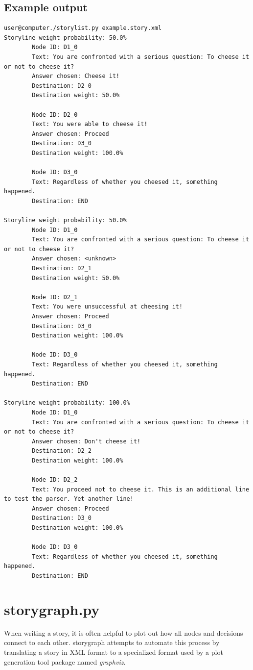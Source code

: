 \documentclass[12pt,letterpaper]{article}
\begin{document}
 \subsection{Example output}
 \begin{lstlisting}[breaklines=true]
user@computer./storylist.py example.story.xml
Storyline weight probability: 50.0%
        Node ID: D1_0
        Text: You are confronted with a serious question: To cheese it or not to cheese it?
        Answer chosen: Cheese it!
        Destination: D2_0
        Destination weight: 50.0%

        Node ID: D2_0
        Text: You were able to cheese it!
        Answer chosen: Proceed
        Destination: D3_0
        Destination weight: 100.0%

        Node ID: D3_0
        Text: Regardless of whether you cheesed it, something happened.
        Destination: END

Storyline weight probability: 50.0%
        Node ID: D1_0
        Text: You are confronted with a serious question: To cheese it or not to cheese it?
        Answer chosen: <unknown>
        Destination: D2_1
        Destination weight: 50.0%

        Node ID: D2_1
        Text: You were unsuccessful at cheesing it!
        Answer chosen: Proceed
        Destination: D3_0
        Destination weight: 100.0%

        Node ID: D3_0
        Text: Regardless of whether you cheesed it, something happened.
        Destination: END

Storyline weight probability: 100.0%
        Node ID: D1_0
        Text: You are confronted with a serious question: To cheese it or not to cheese it?
        Answer chosen: Don't cheese it!
        Destination: D2_2
        Destination weight: 100.0%

        Node ID: D2_2
        Text: You proceed not to cheese it. This is an additional line to test the parser. Yet another line!
        Answer chosen: Proceed
        Destination: D3_0
        Destination weight: 100.0%

        Node ID: D3_0
        Text: Regardless of whether you cheesed it, something happened.
        Destination: END
 \end{lstlisting}
 
 \section{storygraph.py}
 When writing a story, it is often helpful to plot out how all nodes and decisions connect to each other. storygraph
 attempts to automate this process by translating a story in XML format to a specialized format used by a plot generation
 tool package named \textit{graphviz}.
 
\end{document}
